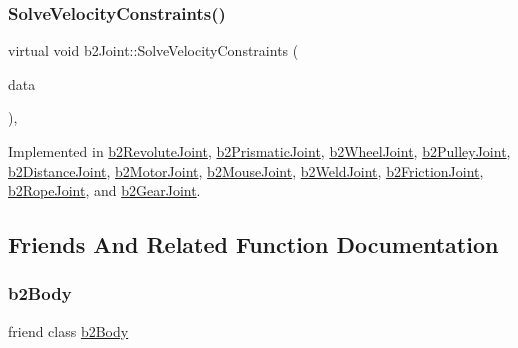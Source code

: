 \subsubsection{\texorpdfstring{SolveVelocityConstraints()}{SolveVelocityConstraints()}}
{\footnotesize\ttfamily virtual void b2\+Joint\+::\+Solve\+Velocity\+Constraints (\begin{DoxyParamCaption}\item[{const \mbox{\hyperlink{structb2_solver_data}{b2\+Solver\+Data}} \&}]{data }\end{DoxyParamCaption})\hspace{0.3cm}{\ttfamily [protected]}, {}}



Implemented in \mbox{\hyperlink{classb2_revolute_joint_a8eee8e87c79588ff041f1382b7fcbcd4}{b2\+Revolute\+Joint}}, \mbox{\hyperlink{classb2_prismatic_joint_a028c0ca03ca8437606d1175ca8de63d6}{b2\+Prismatic\+Joint}}, \mbox{\hyperlink{classb2_wheel_joint_afbda202bc67d58cac38e3c5b138b93f7}{b2\+Wheel\+Joint}}, \mbox{\hyperlink{classb2_pulley_joint_a80de874e392a8238fd2e965f5080222b}{b2\+Pulley\+Joint}}, \mbox{\hyperlink{classb2_distance_joint_ad42429151fb979a230f103d684d2a42c}{b2\+Distance\+Joint}}, \mbox{\hyperlink{classb2_motor_joint_a620c75b301aeab409f9d50a041a80fb8}{b2\+Motor\+Joint}}, \mbox{\hyperlink{classb2_mouse_joint_a9256297320a1a67e9dc49b70f4798dd8}{b2\+Mouse\+Joint}}, \mbox{\hyperlink{classb2_weld_joint_a0367580735b117dcf9a4292df4daf883}{b2\+Weld\+Joint}}, \mbox{\hyperlink{classb2_friction_joint_a49109c1785d949e99a809a8c297abf13}{b2\+Friction\+Joint}}, \mbox{\hyperlink{classb2_rope_joint_a08bf8f6cffe281a9f58ee469f99bf5b1}{b2\+Rope\+Joint}}, and \mbox{\hyperlink{classb2_gear_joint_a25ff465354108f5ae2b60fb9f7836820}{b2\+Gear\+Joint}}.



\subsection{Friends And Related Function Documentation}
\mbox{\label{classb2_joint_a010ab52de250e5fe30a45d642f46405b}} 
\subsubsection{\texorpdfstring{b2Body}{b2Body}}
{\footnotesize\ttfamily friend class \mbox{\hyperlink{classb2_body}{b2\+Body}}\hspace{0.3cm}{\ttfamily [friend]}}

